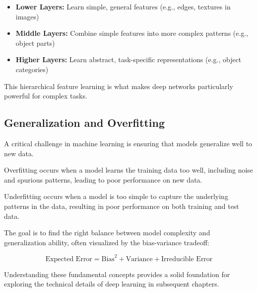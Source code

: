 \begin{itemize}
    \item \textbf{Lower Layers:} Learn simple, general features (e.g., edges, textures in images)
    \item \textbf{Middle Layers:} Combine simple features into more complex patterns (e.g., object parts)
    \item \textbf{Higher Layers:} Learn abstract, task-specific representations (e.g., object categories)
\end{itemize}

This hierarchical feature learning is what makes deep networks particularly powerful for complex tasks.

\subsection{Generalization and Overfitting}

A critical challenge in machine learning is ensuring that models generalize well to new data.

\begin{definition}[Overfitting]
Overfitting occurs when a model learns the training data too well, including noise and spurious patterns, leading to poor performance on new data.
\end{definition}

\begin{definition}[Underfitting]
Underfitting occurs when a model is too simple to capture the underlying patterns in the data, resulting in poor performance on both training and test data.
\end{definition}

The goal is to find the right balance between model complexity and generalization ability, often visualized by the bias-variance tradeoff:

\begin{equation}
    \text{Expected Error} = \text{Bias}^2 + \text{Variance} + \text{Irreducible Error}
\end{equation}

Understanding these fundamental concepts provides a solid foundation for exploring the technical details of deep learning in subsequent chapters.
